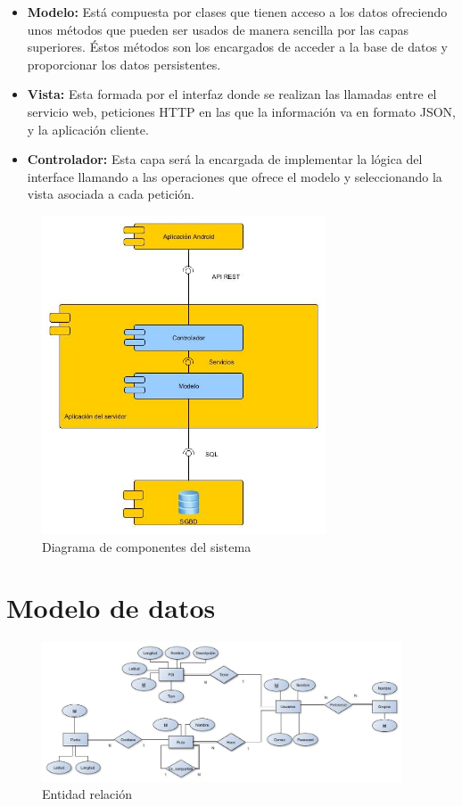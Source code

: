 \begin{itemize}
\item \textbf{Modelo:}
Está compuesta por clases que tienen acceso a los datos ofreciendo unos métodos que pueden ser usados de manera sencilla por las capas superiores. Éstos métodos son los encargados de acceder a la base de datos y proporcionar los datos persistentes.
\item \textbf{Vista:}
Esta formada por el interfaz donde se realizan las llamadas entre el servicio web, peticiones HTTP en las que la información va en formato JSON, y la aplicación cliente.
\item \textbf{Controlador:}
Esta capa será la encargada de implementar la lógica del interface llamando a las operaciones que ofrece el modelo y seleccionando la vista asociada a cada petición.
\end{itemize}
\begin{figure}[H]
		\centering
		\includegraphics[width=0.75\textwidth] {componentes.jpg}
		\caption{Diagrama de componentes del sistema }
	\end{figure}

\section{Modelo de datos}
\begin{figure}[H]
		\centering
		\includegraphics[width=0.95\textwidth] {BD.jpg}
		\caption{Entidad relación  }
	\end{figure}
